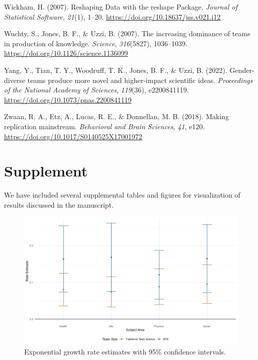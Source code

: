 \documentclass[
  man,floatsintext]{apa7}
\newlength{\cslhangindent}
\newenvironment{CSLReferences}[2] %
 {\begin{list}{}{%
  \setlength{\itemindent}{0pt}
  \setlength{\leftmargin}{0pt}
  \setlength{\parsep}{0pt}
  \ifodd #1
   \setlength{\leftmargin}{\cslhangindent}
   \setlength{\itemindent}{-1\cslhangindent}
  \fi
  \setlength{\itemsep}{#2\baselineskip}}}
 {\end{list}}
\begin{document}
\begin{CSLReferences}{1}{0}
Wickham, H. (2007). Reshaping Data with the reshape Package. \emph{Journal of Statistical Software}, \emph{21}(1), 1--20. \url{https://doi.org/10.18637/jss.v021.i12}

Wuchty, S., Jones, B. F., \& Uzzi, B. (2007). The increasing dominance of teams in production of knowledge. \emph{Science}, \emph{316}(5827), 1036--1039. \url{https://doi.org/10.1126/science.1136099}

Yang, Y., Tian, T. Y., Woodruff, T. K., Jones, B. F., \& Uzzi, B. (2022). Gender-diverse teams produce more novel and higher-impact scientific ideas. \emph{Proceedings of the National Academy of Sciences}, \emph{119}(36), e2200841119. \url{https://doi.org/10.1073/pnas.2200841119}

Zwaan, R. A., Etz, A., Lucas, R. E., \& Donnellan, M. B. (2018). Making replication mainstream. \emph{Behavioral and Brain Sciences}, \emph{41}, e120. \url{https://doi.org/10.1017/S0140525X17001972}

\end{CSLReferences}

\newpage

\section{Supplement}\label{supplement}

We have included several supplemental tables and figures for visualization of results discussed in the manuscript.

\begin{figure}
\includegraphics[width=1\linewidth]{figure/figure_3_growth} \caption{Exponential growth rate estimates with 95\% confidence intervals.}\label{fig:rate-estimates-fig}
\end{figure}
\end{document}
